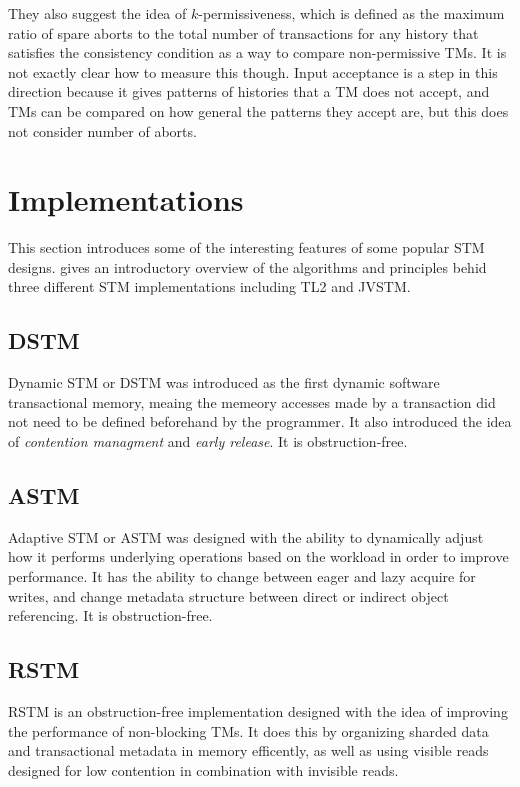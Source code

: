 They also suggest the idea of $k$-permissiveness, which is defined as the maximum ratio of spare aborts to the total number of transactions for any history that satisfies the consistency condition as a way to compare non-permissive TMs.
It is not exactly clear how to measure this though.
Input acceptance \cite{LPD-ARTICLE-2009-004} is a step in this direction because it gives patterns of histories that a TM does not accept, and TMs can be compared on how general the patterns they accept are, but this does not consider number of aborts.


\section{Implementations}
This section introduces some of the interesting features of some popular STM designs.
\cite{1612021} gives an introductory overview of the algorithms and principles behid three different STM implementations including TL2 and JVSTM.

\subsection{DSTM}
Dynamic STM or DSTM \cite{872048} was introduced as the first dynamic software transactional memory, meaing the memeory accesses made by a transaction did not need to be defined beforehand by the programmer.
It also introduced the idea of \emph{contention managment} and \emph{early release}.
It is obstruction-free.

\subsection{ASTM}
Adaptive STM or ASTM \cite{Marathe05adaptivesoftware} was designed with the ability to dynamically adjust how it performs underlying operations based on the workload in order to improve performance.
It has the ability to change between eager and lazy acquire for writes, and change metadata structure between direct or indirect object referencing.
It is obstruction-free.

\subsection{RSTM}
RSTM \cite{Marathe06loweringthe} is an obstruction-free implementation designed with the idea of improving the performance of non-blocking TMs.
It does this by organizing sharded data and transactional metadata in memory efficently, as well as using visible reads designed for low contention in combination with invisible reads.

